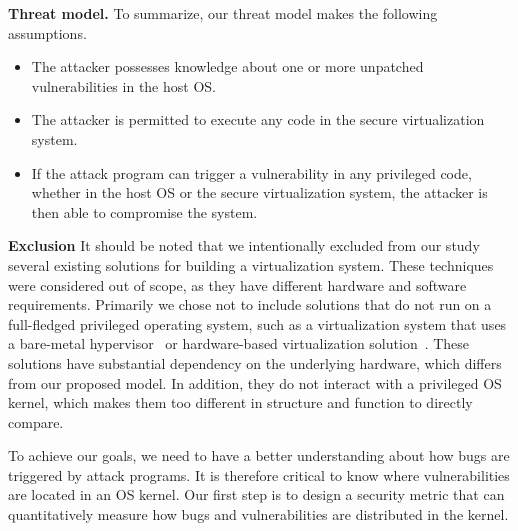 \noindent\textbf{Threat model.}
To summarize, our threat model makes the following assumptions.

\begin{itemize}\setlength\itemsep{0em}

\item The attacker possesses knowledge about one or more unpatched vulnerabilities in the host OS.

\item The attacker is permitted to execute any code in the secure virtualization system.

\item If the attack program can trigger a vulnerability in any privileged code,
whether in the host OS or the secure virtualization system, the attacker is then able to
compromise the system.

\end{itemize}

\textbf{Exclusion}
It should be noted that we intentionally excluded from our study several existing
solutions for building a virtualization system. These techniques were considered
out of scope, as they have different hardware and software requirements.
Primarily we chose not to include solutions that do not run on a full-fledged
privileged operating system, such as a virtualization system that uses a
bare-metal hypervisor~\cite{Xen-03} or hardware-based virtualization
solution~\cite{IntelVT}.  These solutions
have substantial dependency on the
underlying hardware, which differs from our proposed model. In addition,
they do not interact with a privileged OS kernel, which makes them too different
in structure and function to directly compare.
 

To achieve our goals, we need to have a better understanding about how
bugs are triggered by attack programs. It is therefore critical to know where
vulnerabilities are located in an OS kernel. Our first step is to design
a security metric that can quantitatively measure how bugs and vulnerabilities
are distributed in the kernel.
